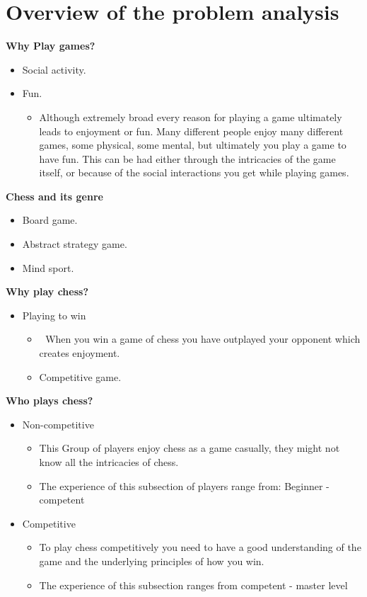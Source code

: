 \section{Overview of the problem analysis}\label{sec:overview}

\textbf{Why Play games?}

\begin{itemize}
    \item Social activity.
    \item Fun.
    \begin{itemize}
        \item Although extremely broad every reason for playing a game ultimately leads to enjoyment or fun.
        Many different people enjoy many different games, some physical, some mental,
        but ultimately you play a game to have fun.
        This can be had either through the intricacies of the game itself,
        or because of the social interactions you get while playing games.
    \end{itemize}
\end{itemize}

\textbf{Chess and its genre}

\begin{itemize}
    \item Board game.
    \item Abstract strategy game.
    \item Mind sport.
\end{itemize}

\textbf{Why play chess?}

\begin{itemize}
    \item Playing to win
    \begin{itemize}
        \item 	When you win a game of chess you have outplayed
        your opponent which creates enjoyment.
        \item Competitive game.
    \end{itemize}
\end{itemize}

\textbf{Who plays chess?}

\begin{itemize}
    \item Non-competitive
    \begin{itemize}
        \item This Group of players enjoy chess as a game casually,
        they might not know all the intricacies of chess.
        \item The experience of this subsection of players range from: Beginner - competent
    \end{itemize}
    \item Competitive
    \begin{itemize}
        \item To play chess competitively you need to have a good understanding
        of the game and the underlying principles of how you win.
        \item The experience of this subsection ranges from competent - master level
    \end{itemize}
\end{itemize}

